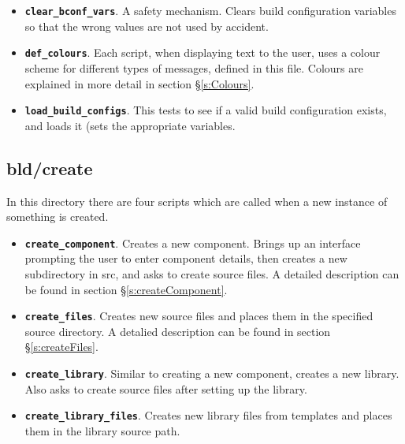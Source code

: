 \documentclass[a4paper, oneside, 11pt, titlepage, onecolumn, openright]{report}
\begin{document}
\begin{itemize}

\item \textbf{\texttt{clear\_bconf\_vars}}. A safety mechanism. Clears build configuration variables so that the wrong values are not used by accident. 

\item \textbf{\texttt{def\_colours}}. Each script, when displaying text to the user, uses a colour scheme for different types of messages, defined in this file. Colours are explained in more detail in section \S\ref{s:Colours}.

\item \textbf{\texttt{load\_build\_configs}}. This tests to see if a valid build configuration exists, and loads it (sets the appropriate variables.

\end{itemize}			
			
\subsection{bld/create}
			\label{ss:bld/create}
			In this directory there are four scripts which are called when a new instance of something is created.
			
\begin{itemize}

\item \textbf{\texttt{create\_component}}. Creates a new component. Brings up an interface prompting the user to enter component details, then creates a new subdirectory in src, and asks to create source files. A detailed description can be found in section \S\ref{s:createComponent}.

\item \textbf{\texttt{create\_files}}. Creates new source files and places them in the specified source directory. A detalied description can be found in section \S\ref{s:createFiles}.

\item \textbf{\texttt{create\_library}}. Similar to creating a new component, creates a new library. Also asks to create source files after setting up the library.

\item \textbf{\texttt{create\_library\_files}}. Creates new library files from templates and places them in the library source path.

\end{itemize}			
\end{document}
